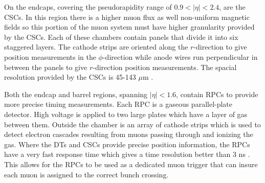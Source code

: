 On the endcaps, covering the pseudorapidity range of $0.9<|\eta|<2.4$, are the CSCs.  In this region there is a higher muon flux as well non-uniform magnetic fields so this portion of the muon system must have higher granularity provided by the CSCs.  Each of these chambers contain panels that divide it into six staggered layers.  The cathode strips are oriented along the $r$-direction to give position measurements in the $\phi$-direction while anode wires run perpendicular in between the panels to give $r$-direction position measurements.  The spacial resolution provided by the CSCs is 45-143 $\mu$m \cite{Sirunyan_2018}.

Both the endcap and barrel regions, spanning  $|\eta|<1.6$, contain RPCs to provide more precise timing measurements.  Each RPC is a gaseous parallel-plate detector.  High voltage is applied to two large plates which have a layer of gas between them.  Outside the chamber is an array of cathode strips which is used to detect electron cascades resulting from muons passing through and ionizing the gas.  Where the DTs and CSCs provide precise position information, the RPCs have a very fast response time which gives a time resolution better than 3 ns \cite{Sirunyan_2018}.  This allows for the RPCs to be used as a dedicated muon trigger that can insure each muon is assigned to the correct bunch crossing.
